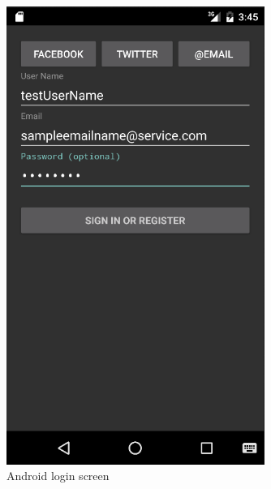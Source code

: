 	\begin{figure}[tbh]
	\begin{center}
	\includegraphics[width=0.75\textwidth]{AndroidPictures/loginScreen.png}
	\end{center}
	\caption{Android login screen \label{AndroudLoginScreen}}
	\end{figure}

